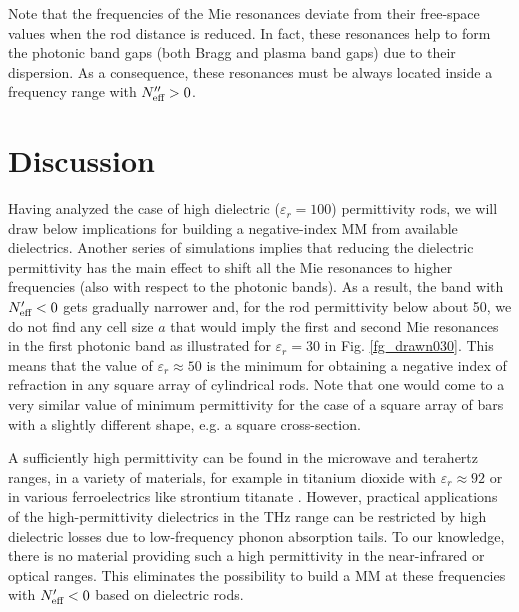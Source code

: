 Note that the frequencies of the Mie resonances deviate from their free-space values when the rod distance is reduced. In fact, these resonances help to form the photonic band gaps (both Bragg and plasma band gaps) due to their dispersion. As a consequence, these resonances must be always located inside a frequency range with $N_{\text{eff} }''>0$.
\section{Discussion}%
Having analyzed the case of high dielectric ($\varepsilon_r=100$) permittivity rods, we will draw below implications for building a negative-index MM from available dielectrics.  Another series of simulations implies that reducing the dielectric permittivity has the main effect to shift all the Mie resonances to higher frequencies (also with respect to the photonic bands). As a result, the band with $N_{\text{eff} }'<0$ gets gradually narrower and, for the rod permittivity below about 50, we do not find any cell size $a$ that would imply the first and second Mie resonances in the first photonic band as illustrated for $\varepsilon_r = 30$ in Fig. \ref{fg_drawn030}. This means that the value of $\varepsilon_{r} \approx 50$ is the minimum for obtaining a negative index of refraction in any square array of cylindrical rods. Note that one would come to a very similar value of minimum permittivity for the case of a square array of bars with a slightly different shape, e.g. a square cross-section. 

A sufficiently high permittivity can be found in the microwave and terahertz ranges, in a variety of materials, for example in titanium dioxide with $\varepsilon_r \approx 92$ \cite{nemec2009tunable} or in various ferroelectrics like strontium titanate \cite{skoromets2011tuning}. However, practical applications of the high-permittivity dielectrics in the THz range can be restricted by high dielectric losses due to low-frequency phonon absorption tails. To our knowledge, there is no material providing such a high permittivity in the near-infrared or optical ranges. This eliminates the possibility to build a MM at these frequencies with $N_{\text{eff} }'<0$ based on dielectric rods.

